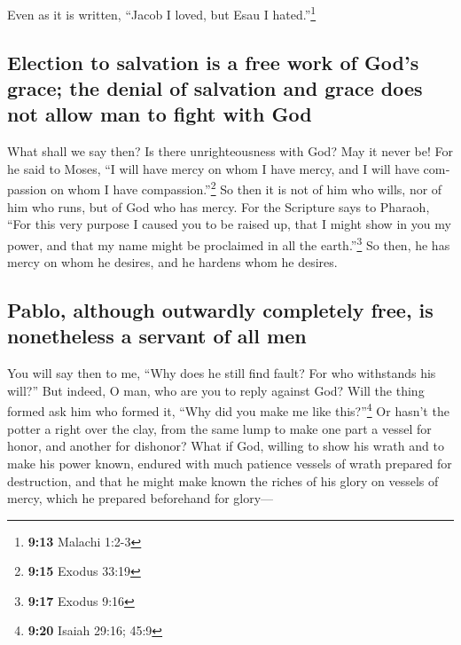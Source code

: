 \begin{paracol}{2}
\begin{otherlanguage}{english}
 Even as it is written, ``Jacob I loved, but Esau I
hated.''\footnote{\textbf{9:13} Malachi 1:2-3}

\hypertarget{election-to-salvation-is-a-free-work-of-gods-grace-the-denial-of-salvation-and-grace-does-not-allow-man-to-fight-with-god}{%
\subsection{Election to salvation is a free work of God's grace; the
denial of salvation and grace does not allow man to fight with
God}\label{election-to-salvation-is-a-free-work-of-gods-grace-the-denial-of-salvation-and-grace-does-not-allow-man-to-fight-with-god}}

 What shall we say then? Is there unrighteousness with
God? May it never be!  For he said to Moses, ``I will
have mercy on whom I have mercy, and I will have compassion on whom I
have compassion.''\footnote{\textbf{9:15} Exodus 33:19} 
So then it is not of him who wills, nor of him who runs, but of God who
has mercy.  For the Scripture says to Pharaoh, ``For this
very purpose I caused you to be raised up, that I might show in you my
power, and that my name might be proclaimed in all the
earth.''\footnote{\textbf{9:17} Exodus 9:16}  So then, he
has mercy on whom he desires, and he hardens whom he desires.

\hypertarget{pablo-although-outwardly-completely-free-is-nonetheless-a-servant-of-all-men}{%
\subsection{Pablo, although outwardly completely free, is nonetheless a
servant of all
men}\label{pablo-although-outwardly-completely-free-is-nonetheless-a-servant-of-all-men}}

 You will say then to me, ``Why does he still find fault?
For who withstands his will?''  But indeed, O man, who
are you to reply against God? Will the thing formed ask him who formed
it, ``Why did you make me like this?''\footnote{\textbf{9:20} Isaiah
  29:16; 45:9}  Or hasn't the potter a right over the
clay, from the same lump to make one part a vessel for honor, and
another for dishonor?  What if God, willing to show his
wrath and to make his power known, endured with much patience vessels of
wrath prepared for destruction,  and that he might make
known the riches of his glory on vessels of mercy, which he prepared
beforehand for glory---


\end{otherlanguage}
\end{paracol}
